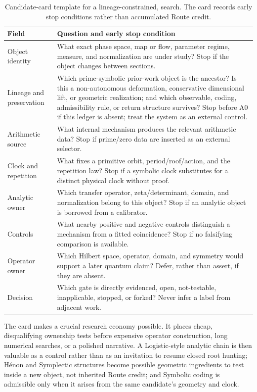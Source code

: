 \begin{table}[tbp]
\centering
\caption{Candidate-card template for a lineage-constrained, \sameobject{} search. The card records early stop conditions rather than accumulated Route credit.}
\label{tab:candidate-card}
\small
\renewcommand{\arraystretch}{1.08}
\begin{tabularx}{\linewidth}{@{}p{.24\linewidth}Y@{}}
\toprule
\textbf{Field} & \textbf{Question and early stop condition} \\
\midrule
Object identity & What exact phase space, map or flow, parameter regime,
measure, and normalization are under study? Stop if the object changes between
sections. \\
Lineage and preservation & Which prime-symbolic prior-work object is the
ancestor? Is this a non-autonomous deformation, conservative dimensional lift,
or geometric realization; and which observable, coding, admissibility rule, or
return structure survives? Stop before A0 if this ledger is absent; treat the
system as an external control. \\
Arithmetic source & What internal mechanism produces the relevant arithmetic
data? Stop if prime/zero data are inserted as an external selector. \\
Clock and repetition & What fixes a primitive orbit, period/roof/action, and
the repetition law? Stop if a symbolic clock substitutes for a distinct
physical clock without proof. \\
Analytic owner & Which transfer operator, zeta/determinant, domain, and
normalization belong to this object? Stop if an analytic object is borrowed
from a calibrator. \\
Controls & What nearby positive and negative controls distinguish a mechanism
from a fitted coincidence? Stop if no falsifying comparison is available. \\
Operator owner & Which Hilbert space, operator, domain, and symmetry would
support a later quantum claim? Defer, rather than assert, if they are absent. \\
Decision & Which gate is directly evidenced, open, not-testable, inapplicable,
stopped, or forked? Never infer a label from adjacent work. \\
\bottomrule
\end{tabularx}
\end{table}

The card makes a crucial research economy possible. It places cheap,
disqualifying ownership tests before expensive operator construction, long
numerical searches, or a polished narrative. A Logistic-style analytic chain
is then valuable as a control rather than as an invitation to resume closed
root hunting; H\'{e}non and Symplectic structures become possible geometric
ingredients to test inside a new object, not inherited Route credit; and
Symbolic coding is admissible only when it arises from the same candidate's
geometry and clock.

